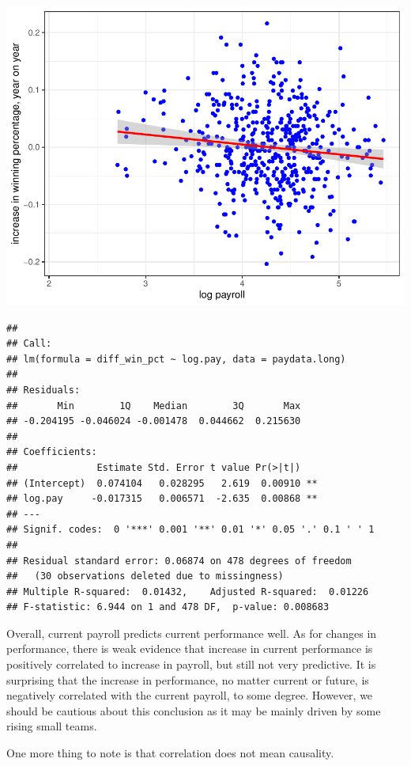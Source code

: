 \documentclass[
  12pt,
]{article}
\begin{document}
\includegraphics{hw1_sol_files/figure-latex/unnamed-chunk-18-3.pdf}

\begin{verbatim}
## 
## Call:
## lm(formula = diff_win_pct ~ log.pay, data = paydata.long)
## 
## Residuals:
##       Min        1Q    Median        3Q       Max 
## -0.204195 -0.046024 -0.001478  0.044662  0.215630 
## 
## Coefficients:
##              Estimate Std. Error t value Pr(>|t|)   
## (Intercept)  0.074104   0.028295   2.619  0.00910 **
## log.pay     -0.017315   0.006571  -2.635  0.00868 **
## ---
## Signif. codes:  0 '***' 0.001 '**' 0.01 '*' 0.05 '.' 0.1 ' ' 1
## 
## Residual standard error: 0.06874 on 478 degrees of freedom
##   (30 observations deleted due to missingness)
## Multiple R-squared:  0.01432,    Adjusted R-squared:  0.01226 
## F-statistic: 6.944 on 1 and 478 DF,  p-value: 0.008683
\end{verbatim}

Overall, current payroll predicts current performance well. As for
changes in performance, there is weak evidence that increase in current
performance is positively correlated to increase in payroll, but still
not very predictive. It is surprising that the increase in performance,
no matter current or future, is negatively correlated with the current
payroll, to some degree. However, we should be cautious about this
conclusion as it may be mainly driven by some rising small teams.

One more thing to note is that correlation does not mean causality.
\end{document}
